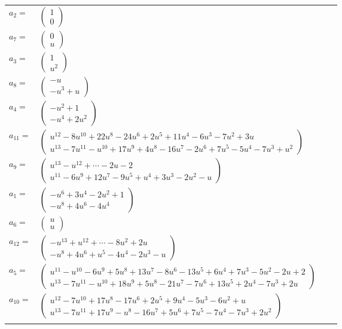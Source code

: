 \documentclass[1p]{elsarticle_modified}
\theoremstyle{definition}
\begin{document}
\begin{tabular}{m{7pt} m{180pt} m{7pt} m{180pt} }
\flushright $a_{2}=$&$\begin{pmatrix}1\\0\end{pmatrix}$ \\
\flushright $a_{7}=$&$\begin{pmatrix}0\\u\end{pmatrix}$ \\
\flushright $a_{3}=$&$\begin{pmatrix}1\\u^2\end{pmatrix}$ \\
\flushright $a_{8}=$&$\begin{pmatrix}- u\\- u^3+u\end{pmatrix}$ \\
\flushright $a_{4}=$&$\begin{pmatrix}- u^2+1\\- u^4+2 u^2\end{pmatrix}$ \\
\flushright $a_{11}=$&$\begin{pmatrix}u^{12}-8 u^{10}+22 u^8-24 u^6+2 u^5+11 u^4-6 u^3-7 u^2+3 u\\u^{13}-7 u^{11}- u^{10}+17 u^9+4 u^8-16 u^7-2 u^6+7 u^5-5 u^4-7 u^3+u^2\end{pmatrix}$ \\
\flushright $a_{9}=$&$\begin{pmatrix}u^{13}- u^{12}+\cdots-2 u-2\\u^{11}-6 u^9+12 u^7-9 u^5+u^4+3 u^3-2 u^2- u\end{pmatrix}$ \\
\flushright $a_{1}=$&$\begin{pmatrix}- u^6+3 u^4-2 u^2+1\\- u^8+4 u^6-4 u^4\end{pmatrix}$ \\
\flushright $a_{6}=$&$\begin{pmatrix}u\\u\end{pmatrix}$ \\
\flushright $a_{12}=$&$\begin{pmatrix}- u^{13}+u^{12}+\cdots-8 u^2+2 u\\- u^8+4 u^6+u^5-4 u^4-2 u^3- u\end{pmatrix}$ \\
\flushright $a_{5}=$&$\begin{pmatrix}u^{11}- u^{10}-6 u^9+5 u^8+13 u^7-8 u^6-13 u^5+6 u^4+7 u^3-5 u^2-2 u+2\\u^{13}-7 u^{11}- u^{10}+18 u^9+5 u^8-21 u^7-7 u^6+13 u^5+2 u^4-7 u^3+2 u\end{pmatrix}$ \\
\flushright $a_{10}=$&$\begin{pmatrix}u^{12}-7 u^{10}+17 u^8-17 u^6+2 u^5+9 u^4-5 u^3-6 u^2+u\\u^{13}-7 u^{11}+17 u^9- u^8-16 u^7+5 u^6+7 u^5-7 u^4-7 u^3+2 u^2\end{pmatrix}$\\&\end{tabular}
\end{document}
